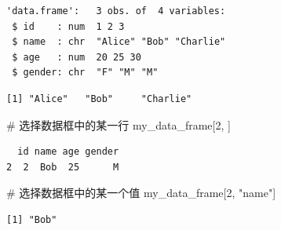 \documentclass[
  letterpaper,
  DIV=11,
  numbers=noendperiod]{scrreprt}
\newenvironment{Shaded}{\begin{snugshade}}{\end{snugshade}}
\newcommand{\CommentTok}[1]{\textcolor[rgb]{0.37,0.37,0.37}{#1}}
\newcommand{\DecValTok}[1]{\textcolor[rgb]{0.68,0.00,0.00}{#1}}
\newcommand{\NormalTok}[1]{\textcolor[rgb]{0.00,0.23,0.31}{#1}}
\newcommand{\SpecialCharTok}[1]{\textcolor[rgb]{0.37,0.37,0.37}{#1}}
\newcommand{\StringTok}[1]{\textcolor[rgb]{0.13,0.47,0.30}{#1}}
\begin{document}
\begin{verbatim}
'data.frame':   3 obs. of  4 variables:
 $ id    : num  1 2 3
 $ name  : chr  "Alice" "Bob" "Charlie"
 $ age   : num  20 25 30
 $ gender: chr  "F" "M" "M"
\end{verbatim}

\begin{Shaded}
\end{Shaded}

\begin{verbatim}
[1] "Alice"   "Bob"     "Charlie"
\end{verbatim}

\begin{Shaded}
\begin{Highlighting}[]
\CommentTok{\# 选择数据框中的某一行}
\NormalTok{my\_data\_frame[}\DecValTok{2}\NormalTok{, ]}
\end{Highlighting}
\end{Shaded}

\begin{verbatim}
  id name age gender
2  2  Bob  25      M
\end{verbatim}

\begin{Shaded}
\begin{Highlighting}[]
\CommentTok{\# 选择数据框中的某一个值}
\NormalTok{my\_data\_frame[}\DecValTok{2}\NormalTok{, }\StringTok{"name"}\NormalTok{]}
\end{Highlighting}
\end{Shaded}

\begin{verbatim}
[1] "Bob"
\end{verbatim}
\end{document}
